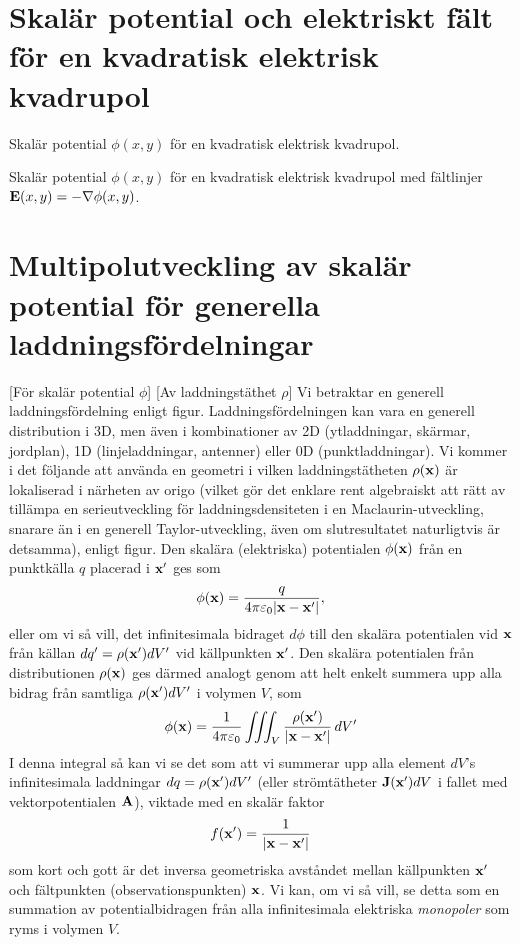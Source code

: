 {{{{{\section{Skal{\"a}r potential och elektriskt f{\"a}lt f{\"o}r en kvadratisk
         elektrisk kvadrupol}
\centerline{\epsfxsize=142mm
  }
\noindent
{\captionwide Skal{\"a}r potential $\phi(x,y)$ f{\"o}r en kvadratisk elektrisk
kvadrupol.}
\medskip
\centerline{\epsfxsize=142mm
  }
\noindent
{\captionwide Skal{\"a}r potential $\phi(x,y)$ f{\"o}r en kvadratisk
elektrisk kvadrupol med f{\"a}ltlinjer ${\bf E}(x,y)=-\nabla\phi(x,y)$.}

\section{Multipolutveckling av skal{\"a}r potential f{\"o}r generella laddningsf{\"o}rdelningar}
[F{\"o}r skal{\"a}r potential $\phi$]
[Av laddningst{\"a}thet $\rho$]
Vi betraktar en generell laddningsf{\"o}rdelning enligt figur.
Laddningsf{\"ordelningen} kan vara en generell distribution i 3D, men {\"a}ven
i kombinationer av 2D (ytladdningar, sk{\"a}rmar, jordplan),
1D (linjeladdningar, antenner) eller 0D (punktladdningar). Vi kommer i det
f{\"o}ljande att anv{\"a}nda en geometri i vilken laddningst{\"a}theten
$\rho({\bf x})$ {\"a}r lokaliserad i n{\"a}rheten av origo (vilket g{\"o}r
det enklare rent algebraiskt att r{\"a}tt av till{\"a}mpa en serieutveckling
f{\"o}r laddningsdensiteten i en Maclaurin-utveckling, snarare {\"a}n i en
generell Taylor-utveckling, {\"a}ven om slutresultatet naturligtvis {\"a}r
detsamma), enligt figur.
\noindent
Den skal{\"a}ra (elektriska) potentialen $\phi({\bf x})$ fr{\aa}n en
punktk{\"a}lla $q$ placerad i ${\bf x}'$ ges som
$$
  \phi({\bf x})={{q}\over{4\pi\varepsilon_0|{\bf x}-{\bf x}'|}},
$$
eller om vi s{\aa} vill, det infinitesimala bidraget $d\phi$ till den
skal{\"a}ra potentialen vid ${\bf x}$ fr{\aa}n k{\"a}llan
$dq'=\rho({\bf x}')dV'$ vid k{\"a}llpunkten ${\bf x}'$.
\noindent
Den skal{\"a}ra potentialen fr{\aa}n distributionen $\rho({\bf x})$ ges
d{\"a}rmed analogt genom att helt enkelt summera upp alla bidrag fr{\aa}n
samtliga $\rho({\bf x}')dV'$ i volymen $V$, som
$$
  \phi({\bf x})={{1}\over{4\pi\varepsilon_0}}
     \iiint_{V}{{\rho({\bf x}')}\over{|{\bf x}-{\bf x}'|}}\,dV'
$$
I denna integral s{\aa} kan vi se det som att vi summerar upp alla element
$dV$'s infinitesimala laddningar $dq=\rho({\bf x}')dV'$ (eller
str{\"o}mt{\"a}theter ${\bf J}({\bf x}')dV$ i fallet med vektorpotentialen
${\bf A}$), viktade med en skal{\"a}r faktor
$$
  f({\bf x}')={{1}\over{|{\bf x}-{\bf x}'|}}
$$
som kort och gott {\"a}r det inversa geometriska avst{\aa}ndet mellan
k{\"a}llpunkten ${\bf x}'$ och f{\"a}ltpunkten (observationspunkten) ${\bf x}$.
Vi kan, om vi s{\aa} vill, se detta som en summation av potentialbidragen
fr{\aa}n alla infinitesimala elektriska {\it monopoler} som ryms i volymen
$V$.

}}}}}
